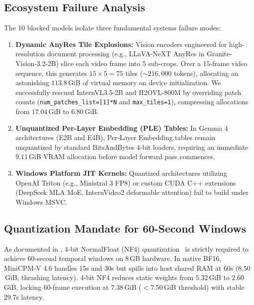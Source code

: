 \documentclass[10pt,twocolumn,letterpaper]{article}
\begin{document}
\subsection{Ecosystem Failure Analysis}
The 10 blocked models isolate three fundamental systems failure modes:
\begin{enumerate}
    \item \textbf{Dynamic AnyRes Tile Explosions:} Vision encoders engineered for high-resolution document processing (e.g., LLaVA-NeXT AnyRes in Granite-Vision-3.2-2B) slice each video frame into 5 sub-crops. Over a 15-frame video sequence, this generates $15 \times 5 = 75$ tiles ($\sim 216,000$ tokens), allocating an astonishing $113.8$\,GiB of virtual memory on device initialization. We successfully rescued InternVL3.5-2B and H2OVL-800M by overriding patch counts (\texttt{num\_patches\_list=[1]*N} and \texttt{max\_tiles=1}), compressing allocations from $17.04$\,GiB to $6.80$\,GiB.
    \item \textbf{Unquantized Per-Layer Embedding (PLE) Tables:} In Gemma 4 architectures (E2B and E4B), Per-Layer Embedding tables remain unquantized by standard BitsAndBytes 4-bit loaders, requiring an immediate $9.11$\,GiB VRAM allocation before model forward pass commences.
    \item \textbf{Windows Platform JIT Kernels:} Quantized architectures utilizing OpenAI Triton (e.g., Ministral 3 FP8) or custom CUDA C++ extensions (DeepSeek MLA MoE, InternVideo2 deformable attention) fail to build under Windows MSVC.
\end{enumerate}

\subsection{Quantization Mandate for 60-Second Windows}
As documented in , 4-bit NormalFloat (NF4) quantization~\cite{dettmers2023qlora} is strictly required to achieve 60-second temporal windows on 8\,GB hardware. In native BF16, MiniCPM-V 4.6 handles 15s and 30s but spills into host shared RAM at 60s ($8.50$\,GiB, thrashing latency). 4-bit NF4 reduces static weights from $5.32$\,GiB to $2.60$\,GiB, locking 60-frame execution at $7.38$\,GiB ($<7.50$\,GiB threshold) with stable 29.7s latency.
\end{document}
